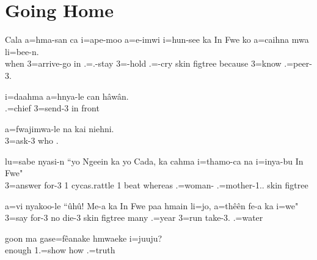 \section{Going Home}

\ea
\gll Cala a=hma-san ca i=ape-moo a=e-imwi i=hun-see ka In Fwe ko a=caihna mwa li=bee-n.\\ when 3=arrive-go in .=.-stay 3=-hold .=-cry  skin figtree because 3=know  .=peer-3.\\ \glt {}
\z

\ea
\gll i=daahma a=hnya-le can hâwân.\\ 
    .=chief 3=send-3 in front\\ 
    \glt {}
\z

\ea
\gll a=fwajimwa-le na kai niehni.\\ 
    3=ask-3  who .\\ 
    \glt {}
\z

\ea
\gll lu=sabe nyasi-n ``yo Ngeein ka yo Cada, ka cahma i=thamo-ca na i=inya-bu In Fwe"\\ 3=answer for-3 1 cycas.rattle  1 beat  whereas .=woman-  .=mother-1.. skin figtree\\ \glt {}
\z

\ea
\gll a=vi nyakoo-le ``ûhû! Me-a ka In Fwe paa hmain li=jo, a=thêên fe-a ka i=we"\\ 3=say for-3 no die-3  skin figtree  many .=year 3=run take-3.  .=water\\ \glt {}
\z

\ea
\gll goon ma gase=fêanake hmwaeke i=juuju?\\ enough  1.=show how .=truth\\ \glt {}
\z

